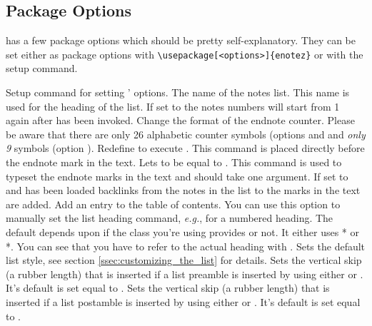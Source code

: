 \documentclass[toc=bib,toc=index]{cnpkgdoc}
\begin{document}
\subsection{Package Options}
\enotez has a few package options which should be pretty self-explanatory.
They can be set either as package options with
\verb=\usepackage[<options>]{enotez}= or with the setup command.
\begin{beschreibung}
  \newline
    Setup command for setting \enotez' options.
    The name of the notes list. This name is used for the heading of the
    list.
    If set to  the notes numbers will start from 1 again after
     has been invoked.
    Change the format of the endnote counter.  Please be aware that there are
    only 26 alphabetic counter symbols (options  and 
    and \emph{only 9} symbols (option ).
  \Default{}
    Redefine  to execute .  This command is
    placed directly before the endnote mark in the text.
    Lets  to be equal to .  This command
    is used to typeset the endnote marks in the text and should take one
    argument.
    If set to  and  has been
    loaded backlinks from the notes in the list to the marks in the text are
    added.
    Add an entry to the table of contents.
  \newline
    You can use this option to manually set the list heading command,
    \textit{e.g.},  for a numbered
    heading.  The default depends upon if the class you're using provides
     or not.  It either uses * or *.
    You can see that you have to refer to the actual heading with .
    Sets the default list style, see section \ref{ssec:customizing_the_list}
    for details.
    Sets the vertical skip (a rubber length) that is inserted if a list
    preamble is inserted by using either  or
    .  It's default is set equal to
    .
    Sets the vertical skip (a rubber length) that is inserted if a list
    postamble is inserted by using either  or
    .  It's default is set equal to
    .
\end{beschreibung}
\end{document}
